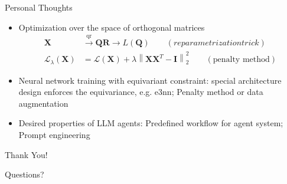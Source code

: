 \documentclass[aspectratio=169]{beamer}
\begin{document}
\begin{frame}{Personal Thoughts}
		\begin{itemize}
			\item Optimization over the space of orthogonal matrices
			\begin{equation*}
				\begin{aligned}
				\mathbf{X} & \overset{\text{qr}}{\to} \mathbf{Q} \mathbf{R} \rightarrow L(\mathbf{Q}) \qquad (reparametrization trick)	\\
				\mathcal{L}_{\lambda}(\mathbf{X}) & = \mathcal{L}(\mathbf{X}) + \lambda \left\| \mathbf{X}\mathbf{X}^T - \mathbf{I} \right\|_2^2
				\qquad (\text{penalty method})
				\end{aligned}
			\end{equation*}
			\item Neural network training with equivariant constraint: special architecture design
			enforces the equivariance, e.g. e3nn; Penalty method or data augmentation
			\item Desired properties of LLM agents: Predefined workflow for agent system; Prompt engineering
		\end{itemize}

\end{frame}


\begin{frame}{}
	\begin{center}
		\Huge Thank You!
		
		\vspace{1cm}
		
		\Large Questions?
	\end{center}
\end{frame}
\end{document}
